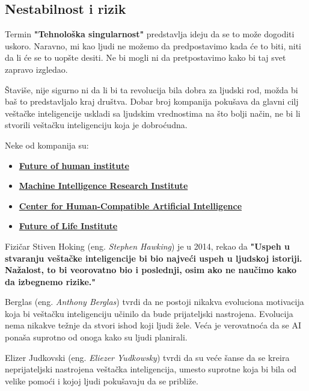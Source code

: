 \documentclass[a4paper]{article}
\begin{document}
\subsection{Nestabilnost i rizik}
\label{subsec:nestabilnost_i_rizik}
\hfill

Termin \textbf{"Tehnološka singularnost"} predstavlja ideju da se to može dogoditi uskoro. Naravno, mi kao ljudi ne možemo da predpostavimo kada će to biti, niti da li će se to uopšte desiti. Ne bi mogli ni da pretpostavimo kako bi taj svet zapravo izgledao. 

Štaviše, nije sigurno ni da li bi ta revolucija bila dobra za ljudski rod, možda bi baš to predstavljalo kraj društva. Dobar broj kompanija pokušava da glavni cilj veštačke inteligencije uskladi sa ljudskim vrednostima na što bolji način, ne bi li stvorili veštačku inteligenciju koja je dobroćudna.

Neke od kompanija su:

\begin{itemize}
    \item  \href{https://www.fhi.ox.ac.uk/}{\textbf{Future of human institute}}
    \item  \href{https://intelligence.org/}{\textbf{Machine Intelligence Research Institute}}
    \item  \href{https://humancompatible.ai/}{\textbf{Center for Human-Compatible Artificial Intelligence}}
    \item  \href{https://futureoflife.org/}{\textbf{Future of Life Institute}}
    
\end{itemize}

Fizičar Stiven Hoking (eng. \textit{Stephen Hawking}) je u 2014, rekao da \textbf{"Uspeh u stvaranju veštačke inteligencije bi bio najveći uspeh u ljudskoj istoriji. Nažalost, to bi veorovatno bio i poslednji, osim ako ne naučimo kako da izbegnemo rizike."}\cite{r2}

Berglas (eng. \textit{Anthony Berglas}) tvrdi da ne postoji nikakva evoluciona motivacija koja bi veštačku inteligenciju učinilo da bude prijateljski nastrojena. Evolucija nema nikakve težnje da stvori ishod koji ljudi žele. Veća je verovatnoća da se AI ponaša suprotno od onoga kako su ljudi planirali.

Elizer Judkovski (eng. \textit{Eliezer Yudkowsky}) tvrdi da su veće šanse da se kreira neprijateljski nastrojena veštačka inteligencija, umesto suprotne koja bi bila od velike pomoći i kojoj ljudi pokušavaju da se približe.
\end{document}
